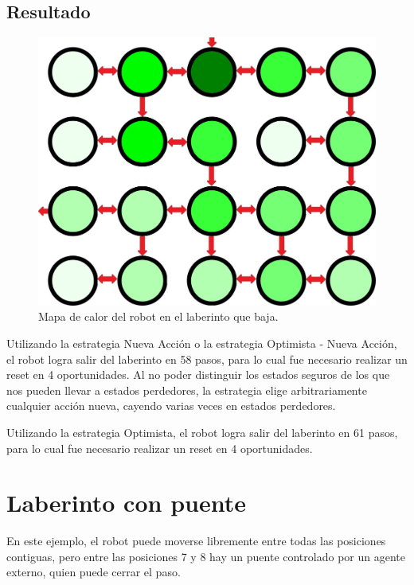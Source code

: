 \clearpage

\subsection{Resultado}

\begin{figure}[H]
	\centering
		\includegraphics[scale=0.2]{Imagenes/Laberintos/down_calor.png}
	\caption{Mapa de calor del robot en el laberinto que baja.}
	\label{fig:down_calor}
\end{figure}

Utilizando la estrategia Nueva Acción o la estrategia Optimista - Nueva Acción, el robot logra salir del laberinto en 58 pasos, para lo cual fue necesario
realizar un reset en 4 oportunidades. Al no poder distinguir los estados seguros de los que nos pueden llevar a estados perdedores, la estrategia elige arbitrariamente cualquier acción nueva, cayendo varias veces en estados perdedores.

\vspace{\baselineskip}

Utilizando la estrategia Optimista, el robot logra salir del laberinto en 61 pasos, para lo cual fue necesario realizar un reset en 4 oportunidades.

\clearpage

\section{Laberinto con puente}

En este ejemplo, el robot puede moverse libremente entre todas las posiciones contiguas, pero entre las posiciones 7 y 8 hay un puente 
controlado por un agente externo, quien puede cerrar el paso.


